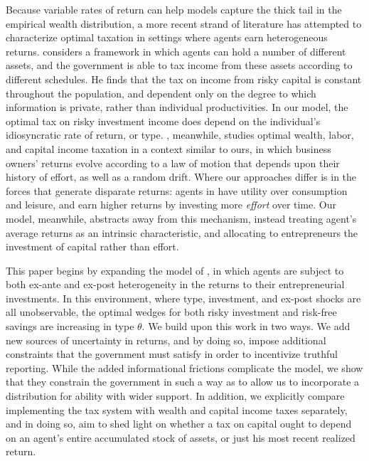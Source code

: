\documentclass[11pt]{article}
\begin{document}
Because variable rates of return can help models capture the thick tail in the empirical wealth distribution, a more recent strand of literature has attempted to characterize optimal taxation in settings where agents earn heterogeneous returns. \cite{phelan2019differential} considers a framework in which agents can hold a number of different assets, and the government is able to tax income from these assets according to different schedules. He finds that the tax on income from risky capital is constant throughout the population, and dependent only on the degree to which information is private, rather than individual productivities. In our model, the optimal tax on risky investment income does depend on the individual's idiosyncratic rate of return, or type. \cite{phelan2019business}, meanwhile, studies optimal wealth, labor, and capital income taxation in a context similar to ours, in which business owners' returns evolve according to a law of motion that depends upon their history of effort, as well as a random drift. Where our approaches differ is in the forces that generate disparate returns: agents in \cite{phelan2019business} have utility over consumption and leisure, and earn higher returns by investing more \textit{effort} over time. Our model, meanwhile, abstracts away from this mechanism, instead treating agent's average returns as an intrinsic characteristic, and allocating to entrepreneurs the investment of capital rather than effort.   

This paper begins by expanding the model of \cite{shourideh2014optimal}, in which agents are subject to both ex-ante and ex-post heterogeneity in the returns to their entrepreneurial investments. In this environment, where type, investment, and ex-post shocks are all unobservable, the optimal wedges for both risky investment and risk-free savings are increasing in type \( \theta \). We build upon this work in two ways. We add new sources of uncertainty in returns, and by doing so, impose additional constraints that the government must satisfy in order to incentivize truthful reporting. While the added informational frictions complicate the model, we show that they constrain the government in such a way as to allow us to incorporate a distribution for ability with wider support. In addition, we explicitly compare implementing the tax system with wealth and capital income taxes separately, and in doing so, aim to shed light on whether a tax on capital ought to depend on an agent's entire accumulated stock of assets, or just his most recent realized return. 
\end{document}
